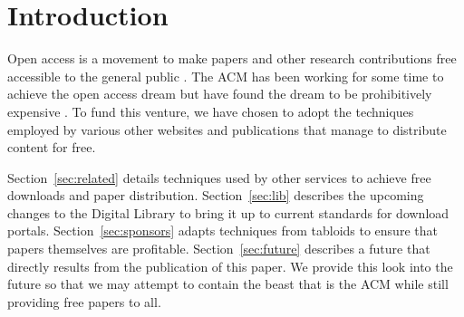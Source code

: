 \section{Introduction}
Open access is a movement to make papers and other research contributions free
accessible to the general public .
The ACM has been working for some time to achieve the open access dream but
have found the dream to be prohibitively expensive .
To fund this venture, we have chosen to adopt the techniques employed by
various other websites and publications that manage to distribute content for
free.

Section~\ref{sec:related} details techniques used by other services to achieve free
downloads and paper distribution.
Section~\ref{sec:lib} describes the upcoming changes to the Digital Library to
bring it up to current standards for download portals.
Section~\ref{sec:sponsors} adapts techniques from tabloids to ensure that papers
themselves are profitable.
Section~\ref{sec:future} describes a future that directly results from the
publication of this paper.
We provide this look into the future so that we may attempt to contain the
beast that is the ACM while still providing free papers to all.
